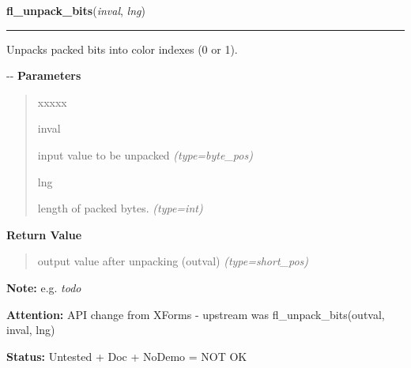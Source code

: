     \label{xformslib:flflimage:fl_unpack_bits}

    \vspace{0.5ex}

\hspace{.8\funcindent}\begin{boxedminipage}{\funcwidth}

    \raggedright \textbf{fl\_unpack\_bits}(\textit{inval}, \textit{lng})

    \vspace{-1.5ex}

    \rule{\textwidth}{0.5\fboxrule}
\setlength{\parskip}{2ex}

Unpacks packed bits into color indexes (0 or 1).

-{}-
\setlength{\parskip}{1ex}
      \textbf{Parameters}
      \vspace{-1ex}

      \begin{quote}
        \begin{Ventry}{xxxxx}

          \item[inval]


input value to be unpacked
            {\it (type=byte\_pos)}

          \item[lng]


length of packed bytes.
            {\it (type=int)}

        \end{Ventry}

      \end{quote}

      \textbf{Return Value}
    \vspace{-1ex}

      \begin{quote}

output value after unpacking (outval)
      {\it (type=short\_pos)}

      \end{quote}

\textbf{Note:} 
e.g. \emph{todo}


\textbf{Attention:} 
API change from XForms - upstream was
fl\_unpack\_bits(outval, inval, lng)


\textbf{Status:} 
Untested + Doc + NoDemo = NOT OK


    \end{boxedminipage}

